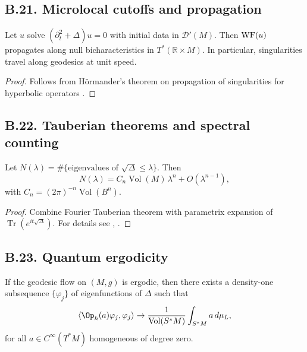 \subsection*{B.21. Microlocal cutoffs and propagation}
\label{appB:microlocal}

\begin{proposition}
\label{prop:propSing}
Let $u$ solve $(\partial_t^2+\Delta)u=0$ with initial data in $\mathcal{D}'(M)$. Then $\mathrm{WF}(u)$ propagates along null bicharacteristics in $T^*(\mathbb{R}\times M)$. In particular, singularities travel along geodesics at unit speed.
\end{proposition}

\begin{proof}
Follows from Hörmander’s theorem on propagation of singularities for hyperbolic operators \cite[Thm.~23.1.4]{HormanderIII}.
\end{proof}

\subsection*{B.22. Tauberian theorems and spectral counting}
\label{appB:tauberian}

\begin{theorem}
\label{thm:weyl}
Let $N(\lambda)=\#\{\text{eigenvalues of }\sqrt{\Delta}\le \lambda\}$. Then
\[
N(\lambda) = C_n \operatorname{Vol}(M)\, \lambda^n + O(\lambda^{n-1}),
\]
with $C_n=(2\pi)^{-n}\operatorname{Vol}(B^n)$.
\end{theorem}

\begin{proof}
Combine Fourier Tauberian theorem with parametrix expansion of $\operatorname{Tr}(e^{it\sqrt{\Delta}})$. For details see \cite{Ivrii}, \cite{SafarovVassiliev}.
\end{proof}

\subsection*{B.23. Quantum ergodicity}
\label{appB:QE}

\begin{theorem}
\label{thm:QE}
If the geodesic flow on $(M,g)$ is ergodic, then there exists a density-one subsequence $\{\varphi_j\}$ of eigenfunctions of $\Delta$ such that
\[
\langle \Op_h(a)\varphi_j, \varphi_j \rangle \to \frac{1}{\operatorname{Vol}(S^*M)}\int_{S^*M} a\, d\mu_L,
\]
for all $a\in C^\infty(T^*M)$ homogeneous of degree zero.
\end{theorem}

